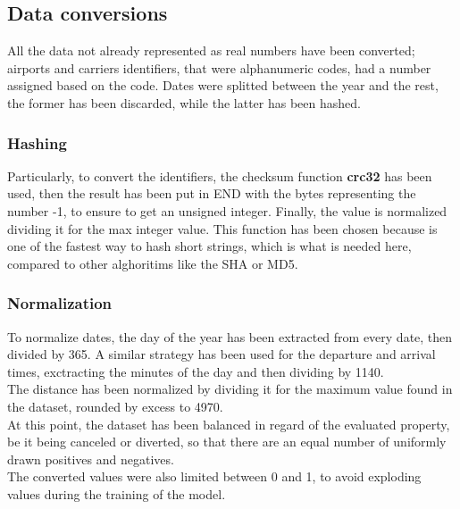 \documentclass[
	letterpaper, %
	10pt, %
]{class}
\begin{document}
\subsection{Data conversions}

All the data not already represented as real numbers have been converted; airports and carriers identifiers, that were alphanumeric codes, had a number assigned based on the code. Dates were splitted between the year and the rest, the former has been discarded, while the latter has been hashed.\\

\subsubsection{Hashing}

Particularly, to convert the identifiers, the checksum function \textbf{crc32} \cite{crc32} has been used, then the result has been put in END with the bytes representing the number -1, to ensure to get an unsigned integer. Finally, the value is normalized dividing it for the max integer value.
This function has been chosen because is one of the fastest way to hash short strings, which is what is needed here, compared to other alghoritims like the SHA or MD5.\\

\subsubsection{Normalization}

To normalize dates, the day of the year has been extracted from every date, then divided by 365. A similar strategy has been used for the departure and arrival times, exctracting the minutes of the day and then dividing by 1140.\\

The distance has been normalized by dividing it for the maximum value found in the dataset, rounded by excess to 4970.\\

At this point, the dataset has been balanced in regard of the evaluated property, be it being canceled or diverted, so that there are an equal number of uniformly drawn positives and negatives.\\

The converted values were also limited between 0 and 1, to avoid exploding values during the training of the model.\\
\end{document}
